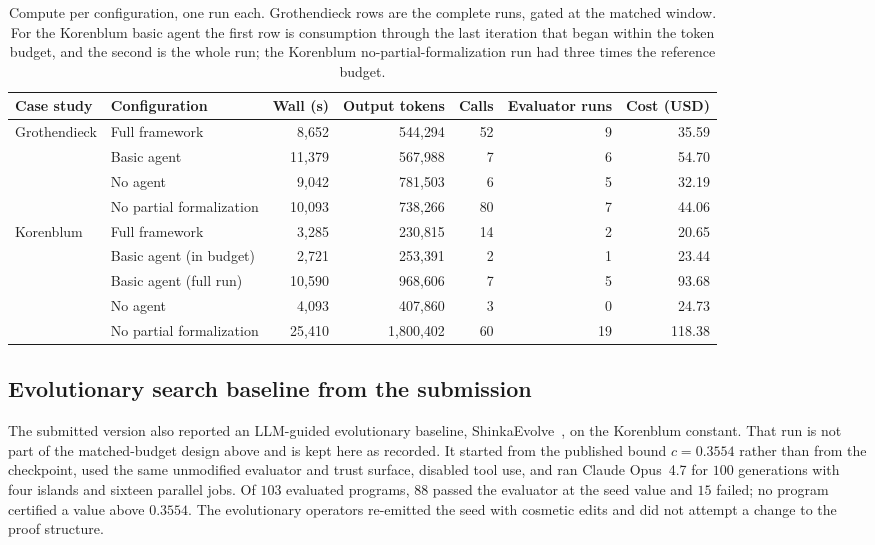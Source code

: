 \begin{table}[t]
\centering
\footnotesize
\setlength{\tabcolsep}{3.5pt}
\begin{tabular}{@{}llrrrrr@{}}
\toprule
Case study & Configuration & Wall (s) & Output tokens & Calls & Evaluator runs & Cost (USD) \\
\midrule
Grothendieck & Full framework           & 8{,}652  & 544{,}294   & 52 & 9  & 35.59 \\
             & Basic agent              & 11{,}379 & 567{,}988   & 7  & 6  & 54.70 \\
             & No agent                 & 9{,}042  & 781{,}503   & 6  & 5  & 32.19 \\
             & No partial formalization & 10{,}093 & 738{,}266   & 80 & 7  & 44.06 \\
\midrule
Korenblum    & Full framework           & 3{,}285  & 230{,}815   & 14 & 2  & 20.65 \\
             & Basic agent (in budget)  & 2{,}721  & 253{,}391   & 2  & 1  & 23.44 \\
             & Basic agent (full run)   & 10{,}590 & 968{,}606   & 7  & 5  & 93.68 \\
             & No agent                 & 4{,}093  & 407{,}860   & 3  & 0  & 24.73 \\
             & No partial formalization & 25{,}410 & 1{,}800{,}402 & 60 & 19 & 118.38 \\
\bottomrule
\end{tabular}
\caption{Compute per configuration, one run each. Grothendieck rows are the
complete runs, gated at the matched window. For the Korenblum basic agent the
first row is consumption through the last iteration that began within the
token budget, and the second is the whole run; the Korenblum
no-partial-formalization run had three times the reference budget.}
\label{tab:ablation-compute}
\end{table}

\subsection{Evolutionary search baseline from the submission}

The submitted version also reported an LLM-guided evolutionary baseline,
ShinkaEvolve~\cite{shinkaevolve}, on the Korenblum constant. That run is not
part of the matched-budget design above and is kept here as recorded. It started
from the published bound $c = 0.3554$ rather than from the checkpoint, used the
same unmodified evaluator and trust surface, disabled tool use, and ran Claude
Opus~4.7 for $100$ generations with four islands and sixteen parallel jobs. Of
$103$ evaluated programs, $88$ passed the evaluator at the seed value and $15$
failed; no program certified a value above $0.3554$. The evolutionary operators
re-emitted the seed with cosmetic edits and did not attempt a change to the
proof structure.

